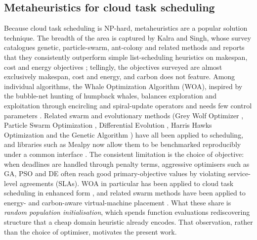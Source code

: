 \documentclass[12pt,a4paper]{article}
\begin{document}
\subsection{Metaheuristics for cloud task scheduling}
Because cloud task scheduling is NP-hard, metaheuristics are a popular solution technique. The breadth of the
area is captured by Kalra and Singh, whose survey catalogues genetic, particle-swarm, ant-colony and related
methods and reports that they consistently outperform simple list-scheduling heuristics on makespan, cost and
energy objectives \cite{kalra2015review}; tellingly, the objectives surveyed are almost exclusively makespan,
cost and energy, and carbon does not feature. Among individual algorithms, the Whale Optimization Algorithm
(WOA), inspired by the bubble-net hunting of humpback whales, balances exploration and exploitation through
encircling and spiral-update operators and needs few control parameters \cite{mirjalili2016whale}. Related
swarm and evolutionary methods (Grey Wolf Optimizer \cite{mirjalili2014grey}, Particle Swarm Optimization
\cite{kennedy1995particle}, Differential Evolution \cite{storn1997differential}, Harris Hawks Optimization
\cite{heidari2019harris} and the Genetic Algorithm \cite{holland1992adaptation}) have all been applied to
scheduling, and libraries such as Mealpy now allow them to be benchmarked reproducibly under a common
interface \cite{vanthieu2023mealpy}. The consistent limitation is the choice of objective: when deadlines are
handled through penalty terms, aggressive optimisers such as GA, PSO and DE often reach good primary-objective
values by violating service-level agreements (SLAs). WOA in particular has been applied to cloud task scheduling in enhanced form
\cite{zhang2024ewoa}, and related swarm methods have been applied to energy- and carbon-aware virtual-machine
placement \cite{feng2025gwo, madhusudhan2023hho, kumar2023eeoa, abbasikhazaei2022energy}. What these share is
\emph{random population initialisation}, which spends function evaluations rediscovering structure that a
cheap domain heuristic already encodes. That observation, rather than the choice of optimiser, motivates the
present work.
\end{document}
